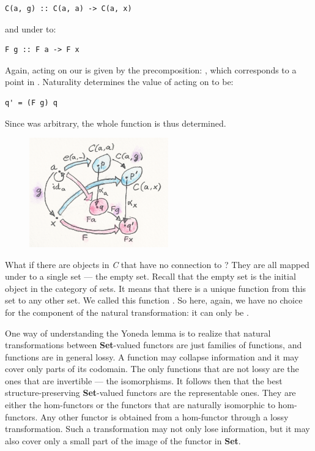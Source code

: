 \begin{Verbatim}[commandchars=\\\{\}]
C(a, g) :: C(a, a) -> C(a, x)
\end{Verbatim}
and under  to:

\begin{Verbatim}[commandchars=\\\{\}]
F g :: F a -> F x
\end{Verbatim}
Again,  acting on our  is given by the
precomposition: , which corresponds to a point
 in . Naturality determines the value
of  acting on  to be:

\begin{Verbatim}[commandchars=\\\{\}]
q' = (F g) q
\end{Verbatim}
Since  was arbitrary, the whole function  is
thus determined.

\begin{figure}[H]
\centering
\includegraphics[width=60mm]{images/yoneda5.png}
\end{figure}

\noindent
What if there are objects in \emph{C} that have no connection to
? They are all mapped under  to a single set
--- the empty set. Recall that the empty set is the initial object in
the category of sets. It means that there is a unique function from this
set to any other set. We called this function . So here,
again, we have no choice for the component of the natural
transformation: it can only be .

One way of understanding the Yoneda lemma is to realize that natural
transformations between \textbf{Set}-valued functors are just families
of functions, and functions are in general lossy. A function may
collapse information and it may cover only parts of its codomain. The
only functions that are not lossy are the ones that are invertible ---
the isomorphisms. It follows then that the best structure-preserving
\textbf{Set}-valued functors are the representable ones. They are either
the hom-functors or the functors that are naturally isomorphic to
hom-functors. Any other functor  is obtained from a
hom-functor through a lossy transformation. Such a transformation may
not only lose information, but it may also cover only a small part of
the image of the functor  in \textbf{Set}.

